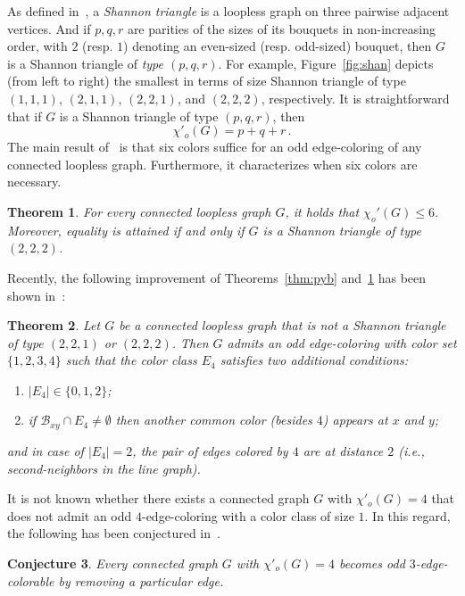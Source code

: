 \documentclass[a4paper,12pt]{article}
\newtheorem{theorem}{Theorem}[section]
\newtheorem{conjecture}[theorem]{Conjecture}
\numberwithin{equation}{section}
\begin{document}
As defined in~\cite{LuzPetSkr15}, a \textit{Shannon triangle} is a loopless graph on three pairwise adjacent vertices. And if $p,q,r$ are parities of the sizes of its bouquets in non-increasing order, with $2$ (resp. $1$) denoting an even-sized (resp. odd-sized) bouquet, then $G$ is a Shannon triangle of \textit{type $(p,q,r)$}. For example, Figure~\ref{fig:shan} depicts (from left to right) the smallest in terms of size Shannon triangle of type $(1,1,1)$, $(2,1,1)$, $(2,2,1)$, and $(2,2,2)$, respectively. It is straightforward that if $G$ is a Shannon triangle of type $(p,q,r)$, then
\begin{equation}
    \label{eqn:shan}
\chi'_{o}(G)=p+q+r\,.
\end{equation}
The main result of~\cite{LuzPetSkr15} is that six colors suffice for an odd edge-coloring of any connected loopless graph. Furthermore, it characterizes when six colors are necessary.
\begin{theorem}
    \label{char:6}
    For every connected loopless graph $G$, it holds that
	$\chi_{o}'(G) \leq 6$.
	Moreover, equality is attained if and only if $G$ is a Shannon triangle of type $(2,2,2)$.
\end{theorem}

Recently, the following improvement of Theorems~\ref{thm:pyb} and~\ref{char:6} has been shown in~\cite{Pet18}:

\begin{theorem}
 \label{odd 4-edge-colorability}
 Let $G$ be a connected loopless graph that is not a Shannon triangle of type $(2,2,1)$ or $(2,2,2)$. Then $G$ admits an odd edge-coloring with color set $\{1,2,3,4\}$ such that the color class $E_4$ satisfies two additional conditions:
\begin{enumerate}
\item[$(i)$] $|E_4|\in\{0,1,2\}$;
\item[$(ii)$] if $\mathcal{B}_{xy}\cap E_4\neq \emptyset$ then another common color (besides $4$) appears at $x$ and $y$;
\end{enumerate}
and in case of $|E_4|=2$, the pair of edges colored by $4$ are at distance $2$ (i.e., second-neighbors in the line graph).
\end{theorem}

It is not known whether there exists a connected graph $G$ with $\chi'_o(G)=4$ that does not admit an odd $4$-edge-coloring with a color class of size $1$. In this regard, the following has been conjectured in~\cite{PetSkr21}.

\begin{conjecture}
    \label{conj:finiteness}
Every connected graph $G$ with $\chi'_o(G)=4$ becomes odd $3$-edge-colorable by removing a particular edge.
\end{conjecture}
\end{document}
